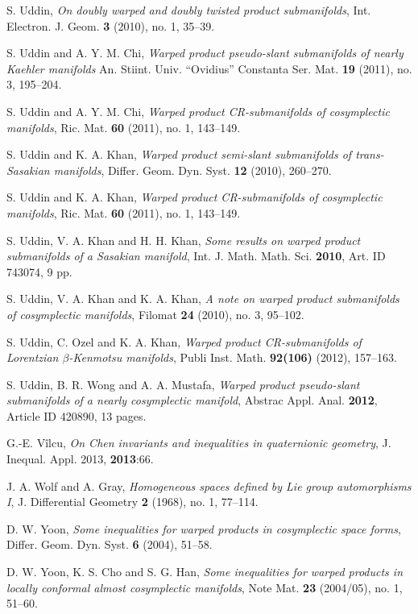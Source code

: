 \documentclass{amsart}
\theoremstyle{plain}
\numberwithin{equation}{section}
\theoremstyle{remark}
\numberwithin{equation}{section}
\begin{document}
\begin{thebibliography}{120}
 S. Uddin, {\it  On doubly warped and doubly twisted product submanifolds}, Int. Electron. J. Geom. {\bf 3} (2010), no. 1, 35--39.

 S.  Uddin and   A. Y. M. Chi, {\it Warped product pseudo-slant submanifolds of nearly Kaehler manifolds}  An. Stiint. Univ. ``Ovidius'' Constanta Ser. Mat. {\bf19} (2011), no. 3, 195--204.

 S.  Uddin and   A. Y. M. Chi, {\it   Warped product CR-submanifolds of cosymplectic manifolds},  Ric. Mat. {\bf 60} (2011), no. 1, 143--149.

 S. Uddin and K. A. Khan, {\it  Warped product semi-slant submanifolds of trans-Sasakian manifolds}, Differ. Geom. Dyn. Syst. {\bf 12} (2010), 260--270.

 S. Uddin and K. A. Khan, {\it  Warped product CR-submanifolds of cosymplectic manifolds},  Ric. Mat. {\bf 60} (2011), no. 1, 143--149.

 S. Uddin, V. A. Khan and H. H. Khan, {\it  Some results on warped product submanifolds of a Sasakian manifold}, Int. J. Math. Math. Sci. {\bf 2010}, Art. ID 743074, 9 pp.

 S. Uddin, V. A. Khan and K. A. Khan, {\it  A note on warped product submanifolds of cosymplectic manifolds}, Filomat {\bf 24} (2010), no. 3, 95--102. 

 S. Uddin, C. Ozel and K. A. Khan, {\it Warped product CR-submanifolds of Lorentzian $\beta$-Kenmotsu manifolds}, Publi Inst. Math. {\bf 92(106)} (2012), 157--163.

 S. Uddin, B. R. Wong and A. A. Mustafa, {\it Warped product pseudo-slant submanifolds of a nearly cosymplectic manifold}, Abstrac Appl. Anal. {\bf 2012}, Article ID 420890, 13 pages.

 G.-E. V\^{i}lcu, {\it On Chen invariants and inequalities in quaternionic geometry}, J. Inequal. Appl. 2013, {\bf 2013}:66.

 J. A. Wolf and  A. Gray,  {\it Homogeneous spaces defined by Lie group automorphisms I}, J. Differential Geometry {\bf 2} (1968), no. 1, 77--114.

 D. W. Yoon, {\it Some inequalities for warped products in cosymplectic space forms}, Differ. Geom. Dyn. Syst. {\bf 6} (2004), 51--58.

 D. W. Yoon, K. S. Cho and S. G. Han, {\it Some inequalities for warped products in locally conformal almost cosymplectic manifolds}, Note Mat. {\bf 23} (2004/05), no. 1, 51--60.

\end{thebibliography}
\end{document}

